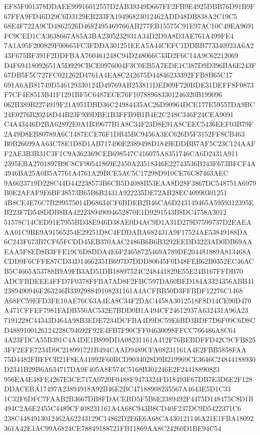 \documentclass[UTF8,fontset=fandol,zihao=-4,a4paper]{ctexart}
\begin{document}
{{EF85F001378DDAEE99916012557D2AB39349D667FF2FB9E4925DBB76D91B9F67FFA9FD46D29C6D3129EB233FA19496823012462ADD48DB838A2C19C5
68E4F722A9CD4862526D4682495469766AB277EB15575C91E97AC10C49EA9691FC9CED1CA3638667A85A3BA2305232931A34D2D9A8D3AE761A499FE4
7A1A95F200829F00665FC3FDDA301251EEA5A44CEFC1DDBB773340923A6A243F675BF391F2DDFBAA760461248C94D248066C33D2F6C14A9C62212069
D4F69418092651A5D929CBCE0976004F3C0EB5A7EDE1C387D9D396BA6E243F67DB5F5C727FC021262D4761A4EA8C242675D44846233392FFB8B65C17
691A6AB81749D546129330124D49769AB253811DED09F720BDE31DEFF8F0873F7CF4E8513B41F1291BF5C6487ECE76F107889683301246320B199096
062B389B2274919F21A951DBD36C24984435AC26D90964DCE177E59557DA9BC24E0276B20248D44B23F939DBE1B3FFB9B1B4E2C248C346F24CEA9091
C4A43446D2BA62892E0A1B39677B1A8C34F23D8E91A8CEEC5436EEF03B79F2A49D8EB80789A6C1487ECE76F1DB45BC9456A3EC626D5F3152FF8CB463
B0B26699AA63C78E1D8D1AB717490E2389498D1849EDDBB7AF5C23C124AAFF2AE3B3B31C3F1C9A362369CEB698547C416075A8351746CA6D2431A911
2395EBA2701897B9C8CF90541869E2450A23518346E22743536B243F673BFCF4A4946BA25A0B5A7761A4761A29BCE5AC5C17298D910CE76C87463AEC
9A6623719D228C44D442238573B6CB5D4088B53EAA8D28F3867DC548751A6979B0E2AFAF9E6BF38573B65B6B2431A922235DE72AB28EC40990301251
4B8CE4E76C7B299575014D68634CF6BDEB2B46CA6D243149465A5959312395EB223F7D548DDB8BA422238949094652870E1D9291543B8DC4758A3012
51578C14CED91E7955BD38E946D38AE0D4AC9D1A31D279D7599737D2EAEAAA01C9BE9A91565254E29251D8C4FDDABA682431A9F17524AE53849188DA
6C243F673B7CF65FCDD45EB370AAC2486B6B6B3292EEDD3223AD0DB69AAEAA5F8ED8B3FFE19C6D8DDA4E6F24658725469A789DE204481889A813468A
CDD9F6CFFE87CD34D14662351B697D7DDD80645F0D48FEB62B0352EC46ACB5C4665A53788B9A9FB3AD51DB18897524C248441829E55E24B167FFDB70
ADCFBDEEE4FFD7F0378FFBA7AD8F2FBC597DA60BED184A3324356ABB412389490946F263246B339298849108231161A4ACFBB50D3FFBDF12276C1468
A68FC59EFD3FE10AE76C63A4EA8C34F2DAC4458A3012518F8D14CE90D470A471CFFEF7981FADB550AC532E7BDD0B1A494CF24612937A632431A96A23
7191228C44343D464A98B3EDE7234DCFBA4D9DC59E6BD3BDF7D6F09C6D8CD4889100126124228C94692F92E4FB7F90CFF04630098FFCC766486A8C64
4A23FDCA55B391C4A4DE1B899DDA08231161A412F76BEBDFFD42C9CFB8253FF2EFE7234D9C218991721B494CAAD9489CFA08231161A4E2FBB5858FAA
75D4482FBFFCB21F8EA41992F60BCD9034028D9B219969CE3646C24844188930D2341B29B6A634717DA9F405A8F574C5168B301246E2F24418890823
956EA4E48FE4267E3CE717A0720F0488F9473324FD18493F67DB7E3D6E2F128DDACEBA17497A23894918A92B46E2BC47188908235567A4643E5D1C33
1C32F6DFC7FAAB2B3667DB8FDACEBD5F5B6E2389492F4475D148475C8D1B494C2A6E2455C4489CF408231161A4A68C943B8CD40F237DC9D5422371C6
238C4484913012462A62243129C14862D2E6E6A68CA430121146A21E1FBA18092361A42E1AC99A6824CE78849188721FB11869AA8C24260D1BE94C54
}}
\end{document}
